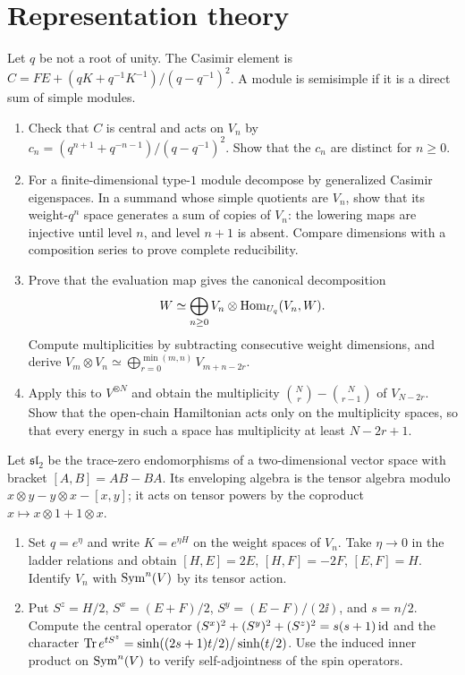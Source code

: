 \section{Representation theory}

\begin{exercise}
Let $q$ be not a root of unity. The Casimir element is
$C=FE+(qK+q^{-1}K^{-1})/(q-q^{-1})^2$.
A module is semisimple if it is a direct sum of simple modules.
\begin{enumerate}[label=(\alph*)]
\item Check that $C$ is central and acts on $V_n$ by
$c_n=(q^{n+1}+q^{-n-1})/(q-q^{-1})^2$.
Show that the $c_n$ are distinct for $n\ge0$.
\item For a finite-dimensional type-$1$ module decompose by
generalized Casimir eigenspaces. In a summand whose simple
quotients are $V_n$, show that its weight-$q^n$ space generates
a sum of copies of $V_n$: the lowering maps are injective
until level $n$, and level $n+1$ is absent.
Compare dimensions with a composition series to prove
complete reducibility.
\item Prove that the evaluation map gives the canonical
decomposition
\[
 W\simeq\bigoplus_{n\ge0}V_n\otimes\operatorname{Hom}_{U_q}(V_n,W).
\]
Compute multiplicities by subtracting consecutive weight
dimensions, and derive
$V_m\otimes V_n\simeq\bigoplus_{r=0}^{\min(m,n)}V_{m+n-2r}$.
\item Apply this to $V^{\otimes N}$ and obtain the multiplicity
$\binom Nr-\binom N{r-1}$ of $V_{N-2r}$.
Show that the open-chain Hamiltonian acts only on the
multiplicity spaces, so that every energy in such a space
has multiplicity at least $N-2r+1$.
\end{enumerate}
\end{exercise}

\begin{exercise}
Let $\mathfrak{sl}_2$ be the trace-zero endomorphisms of a
two-dimensional vector space with bracket $[A,B]=AB-BA$.
Its enveloping algebra is the tensor algebra modulo
$x\otimes y-y\otimes x-[x,y]$; it acts on tensor powers by
the coproduct $x\mapsto x\otimes1+1\otimes x$.
\begin{enumerate}[label=(\alph*)]
\item Set $q=e^\eta$ and write $K=e^{\eta H}$ on the
weight spaces of $V_n$. Take $\eta\to0$ in the ladder
relations and obtain $[H,E]=2E$, $[H,F]=-2F$, $[E,F]=H$.
Identify $V_n$ with $\operatorname{Sym}^n(V)$ by its tensor action.
\item Put $S^z=H/2$, $S^x=(E+F)/2$,
$S^y=(E-F)/(2\ii)$, and $s=n/2$.
Compute the central operator
$(S^x)^2+(S^y)^2+(S^z)^2=s(s+1)\operatorname{id}$ and the character
$\operatorname{Tr} e^{tS^z}=\sinh((2s+1)t/2)/\sinh(t/2)$.
Use the induced inner product on $\operatorname{Sym}^n(V)$ to verify
self-adjointness of the spin operators.
\end{enumerate}
\end{exercise}

